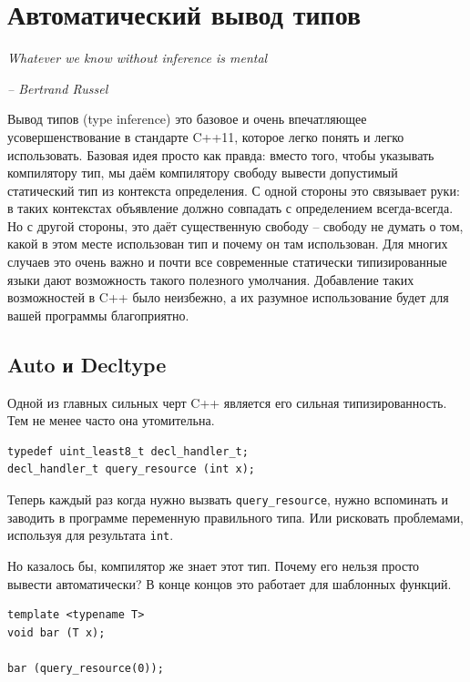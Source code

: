 \documentclass[a4paper,12pt,oneside]{book}
\begin{document}
\pagebreak
\section{Автоматический вывод типов}\label{TypeInference}

\hfill\textit{Whatever we know without inference is mental}{\vspace{0.5em}}

\hfill\textit{-- Bertrand Russel}

Вывод типов (type inference) это базовое и очень впечатляющее усовершенствование в стандарте C++11, которое легко понять и легко использовать. Базовая идея просто как правда: вместо того, чтобы указывать компилятору тип, мы даём компилятору свободу вывести допустимый статический тип из контекста определения. С одной стороны это связывает руки: в таких контекстах объявление должно совпадать с определением всегда-всегда. Но с другой стороны, это даёт существенную свободу -- свободу не думать о том, какой в этом месте использован тип и почему он там использован. Для многих случаев это очень важно и почти все современные статически типизированные языки дают возможность такого полезного умолчания. Добавление таких возможностей в C++ было неизбежно, а их разумное использование будет для вашей программы благоприятно.

\subsection{Auto и Decltype}\label{DecltypeAuto}

Одной из главных сильных черт C++ является его сильная типизированность. Тем не менее часто она утомительна. 

\begin{lstlisting}
typedef uint_least8_t decl_handler_t;
decl_handler_t query_resource (int x);
\end{lstlisting}

Теперь каждый раз когда нужно вызвать \lstinline!query_resource!, нужно вспоминать и заводить в программе переменную правильного типа. Или рисковать проблемами, используя для результата \lstinline!int!.

Но казалось бы, компилятор же знает этот тип. Почему его нельзя просто вывести автоматически? В конце концов это работает для шаблонных функций.

\begin{lstlisting}
template <typename T> 
void bar (T x);

bar (query_resource(0));
\end{lstlisting}
\end{document}
